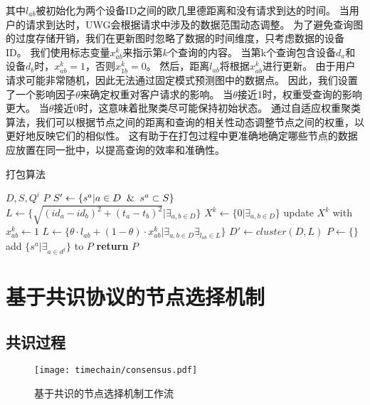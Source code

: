 其中$l_{ab}$被初始化为两个设备ID之间的欧几里德距离和没有请求到达的时间。
当用户的请求到达时，UWG会根据请求中涉及的数据范围动态调整。
为了避免查询图的过度存储开销，我们在更新图时忽略了数据的时间维度，只考虑数据的设备ID。
我们使用标志变量$x_{ab}^k$来指示第$k$个查询的内容。
当第k个查询包含设备$d_a$和设备$d_b$时，$x_{ab}^k=1$，否则$x_{1b}^k=0$。
然后，距离$l_{ab}$将根据$x_{ab}^k$进行更新。
由于用户请求可能非常随机，因此无法通过固定模式预测图中的数据点。
因此，我们设置了一个影响因子$\theta$来确定权重对客户请求的影响。
当$\theta$接近1时，权重受查询的影响更大。
当$\theta$接近0时，这意味着批聚类尽可能保持初始状态。
通过自适应权重聚类算法，我们可以根据节点之间的距离和查询的相关性动态调整节点之间的权重，以更好地反映它们的相似性。
这有助于在打包过程中更准确地确定哪些节点的数据应放置在同一批中，以提高查询的效率和准确性。

\begin{algorithm}[t]
	\caption{打包算法}
	\label{algo:package}
    \begin{algorithmic}[1]
        \REQUIRE $D, S, Q^{i}$
        \ENSURE $P$
        \STATE $S' \gets \{s^a | a \in D \And s^a \subset S\}$
        \STATE $L \gets \Big\{ \sqrt{ (id_a - id_b)^2 + (t_a - t_b)^2 } \Big| \exists_{a,b \in D} \Big\}$
        \STATE $X^k \gets \{0 | \exists_{a,b \in D} \}$
                \STATE \textnormal{update $X^k$ with $x^k_{ab} \gets 1$}
            \ENDIF
        \ENDFOR
        \STATE $L \gets \Big\{ \theta \cdot l_{ab} + (1 - \theta) \cdot x_{ab}^k \Big| \exists_{a,b \in D} \exists_{l_{ab} \in L} \Big\}$
        \STATE $D' \gets \textit{cluster}(D, L)$
        \STATE $P \gets \{\}$
            \STATE \textnormal{add $\{ s^a | \exists_{a \in d^j} \}$ to $P$}
        \ENDFOR
        \STATE \textbf{return} $P$
    \end{algorithmic}
\end{algorithm}

\section{基于共识协议的节点选择机制}
\label{sec:consensus}

\subsection{共识过程}

\begin{figure}[t]
    \centering
    \texttt{[image: timechain/consensus.pdf]}
    \caption{基于共识的节点选择机制工作流}
    \label{fig:consensus}
\end{figure}

